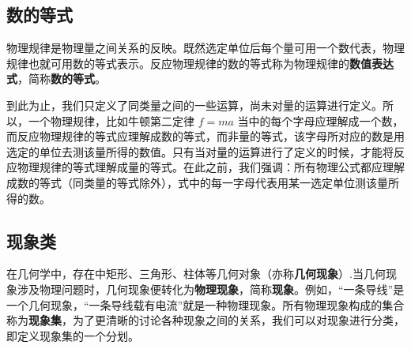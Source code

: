 
\subsection{数的等式}
物理规律是物理量之间关系的反映。既然选定单位后每个量可用一个数代表，物理规律也就可用数的等式表示。反应物理规律的数的等式称为物理规律的\textbf{数值表达式}，简称\textbf{数的等式}。

到此为止，我们只定义了同类量之间的一些运算，尚未对量的运算进行定义。所以，一个物理规律，比如牛顿第二定律 $f=ma$ 当中的每个字母应理解成一个数，而反应物理规律的等式应理解成数的等式，而非量的等式，该字母所对应的数是用选定的单位去测该量所得的数值。只有当对量的运算进行了定义的时候，才能将反应物理规律的等式理解成量的等式。在此之前，我们强调：所有物理公式都应理解成数的等式（同类量的等式除外），式中的每一字母代表用某一选定单位测该量所得的数。
\subsection{现象类}
在几何学中，存在中矩形、三角形、柱体等几何对象（亦称\textbf{几何现象}）.当几何现象涉及物理问题时，几何现象便转化为\textbf{物理现象}，简称\textbf{现象}。例如，“一条导线”是一个几何现象，“一条导线载有电流”就是一种物理现象。所有物理现象构成的集合称为\textbf{现象集}，为了更清晰的讨论各种现象之间的关系，我们可以对现象进行分类，即定义现象集的一个分划。

